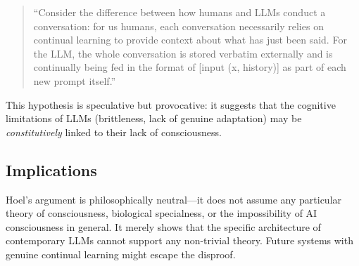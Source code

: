 \begin{quote}
``Consider the difference between how humans and LLMs conduct a conversation: for us humans, each conversation necessarily relies on continual learning to provide context about what has just been said. For the LLM, the whole conversation is stored verbatim externally and is continually being fed in the format of [input (x, history)] as part of each new prompt itself.''~\citep[p.~24]{hoel2025disproof}
\end{quote}

This hypothesis is speculative but provocative: it suggests that the cognitive limitations of LLMs (brittleness, lack of genuine adaptation) may be \emph{constitutively} linked to their lack of consciousness.

\subsection{Implications}

Hoel's argument is philosophically neutral---it does not assume any particular theory of consciousness, biological specialness, or the impossibility of AI consciousness in general. It merely shows that the specific architecture of contemporary LLMs cannot support any non-trivial theory. Future systems with genuine continual learning might escape the disproof.

